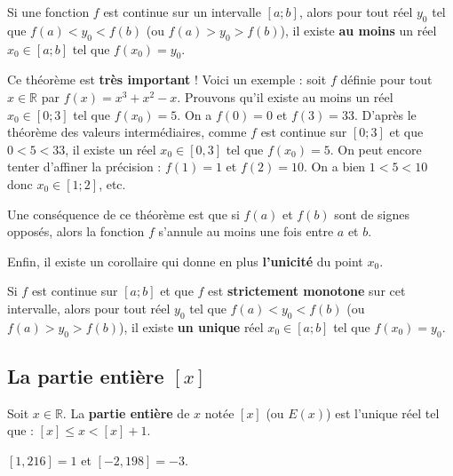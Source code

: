 	\begin{formula}
		Si une fonction $f$ est continue sur un intervalle $[a;b]$, alors pour tout réel $y_0$ tel que $f(a) < y_0 < f(b)$ (ou $f(a) > y_0 > f(b)$), il existe \textbf{au moins} un réel $x_0 \in [a;b]$ tel que $f(x_0) = y_0$.
	\end{formula}

	\begin{tip}[Exemple]
		Ce théorème est \textbf{très important} ! Voici un exemple : soit $f$ définie pour tout $x \in \mathbb{R}$ par $f(x) = x^3+x^2-x$. Prouvons qu'il existe au moins un réel $x_0 \in [0;3]$ tel que $f(x_0) = 5$. On a $f(0) = 0$ et $f(3) = 33$. D'après le théorème des valeurs intermédiaires, comme $f$ est continue sur $[0;3]$ et que $0 < 5 < 33$,
		il existe un réel $x_0 \in [0,3]$ tel que $f(x_0) = 5$.
		\newpar
		On peut encore tenter d'affiner la précision : $f(1) = 1$ et $f(2) = 10$. On a bien $1 < 5 < 10$ donc $x_0 \in [1;2]$, etc.
	\end{tip}

	\begin{tip}
		Une conséquence de ce théorème est que si $f(a)$ et $f(b)$ sont de signes opposés, alors la fonction $f$ s'annule au moins une fois entre $a$ et $b$.
	\end{tip}

	Enfin, il existe un corollaire qui donne en plus \textbf{l'unicité} du point $x_0$.

	\begin{formula}[Corollaire]
		Si $f$ est continue sur $[a;b]$ et que $f$ est \textbf{strictement monotone} sur cet intervalle, alors pour tout réel $y_0$ tel que $f(a) < y_0 < f(b)$ (ou $f(a) > y_0 > f(b)$), il existe \textbf{un unique} réel $x_0 \in [a;b]$ tel que $f(x_0) = y_0$.
	\end{formula}

	\subsection{La partie entière $[x]$}

	\begin{formula}[Définition]
		Soit $x \in \mathbb{R}$. La \textbf{partie entière} de $x$ notée $[x]$ (ou $E(x)$) est l'unique réel tel que : $[x] \leq x < [x] + 1$.
	\end{formula}

	\begin{tip}[Exemple]
		$[1,216] = 1$ et $[-2,198] = -3$.
	\end{tip}

